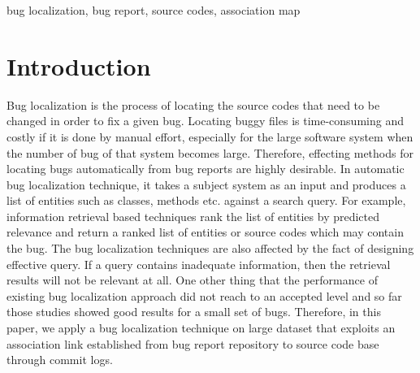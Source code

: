 \documentclass[conference]{IEEEtran}
\begin{document}
\begin{IEEEkeywords}
bug localization, bug report, source codes, association map
\end{IEEEkeywords}

\section{Introduction}
Bug localization is the process of locating the source codes that need to be changed in order to fix a given bug. 
Locating buggy files is time-consuming and costly if it is done by manual effort, especially for the large software system when the number of bug of that system becomes large. Therefore, effecting methods for locating bugs automatically from bug reports are highly desirable. 
In automatic bug localization technique, it takes a subject system as an input and produces a list of entities such as classes, methods etc. against a search query. For example, information retrieval based techniques rank the list of entities by predicted relevance and return a ranked list of entities or source codes which may contain the bug. 
The bug localization techniques are also affected by the fact of designing effective query. If a query contains inadequate information, then the retrieval results will not be relevant at all. One other thing that the performance of existing bug localization approach did not reach to an accepted level and so far those studies showed good results for a small set of bugs. Therefore,
in this paper, we apply a bug localization technique on large dataset that exploits an association link established from bug report repository to source code base through commit logs. 
\end{document}
